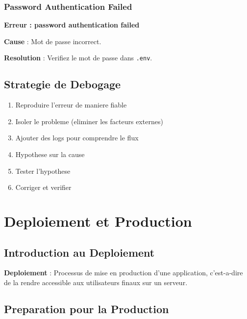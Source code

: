 \documentclass[a4paper,12pt]{book}
\begin{document}
\subsection{Password Authentication Failed}

\begin{errorbox}
    \textbf{Erreur : password authentication failed}

    \textbf{Cause} : Mot de passe incorrect.

    \textbf{Resolution} : Verifiez le mot de passe dans \texttt{.env}.
\end{errorbox}

\section{Strategie de Debogage}

\begin{enumerate}
    \item Reproduire l'erreur de maniere fiable
    \item Isoler le probleme (eliminer les facteurs externes)
    \item Ajouter des logs pour comprendre le flux
    \item Hypothese sur la cause
    \item Tester l'hypothese
    \item Corriger et verifier
\end{enumerate}

\chapter{Deploiement et Production}

\section{Introduction au Deploiement}

\begin{definitionbox}
    \textbf{Deploiement} : Processus de mise en production d'une application, c'est-a-dire de la rendre accessible aux utilisateurs finaux sur un serveur.
\end{definitionbox}

\section{Preparation pour la Production}
\end{document}
